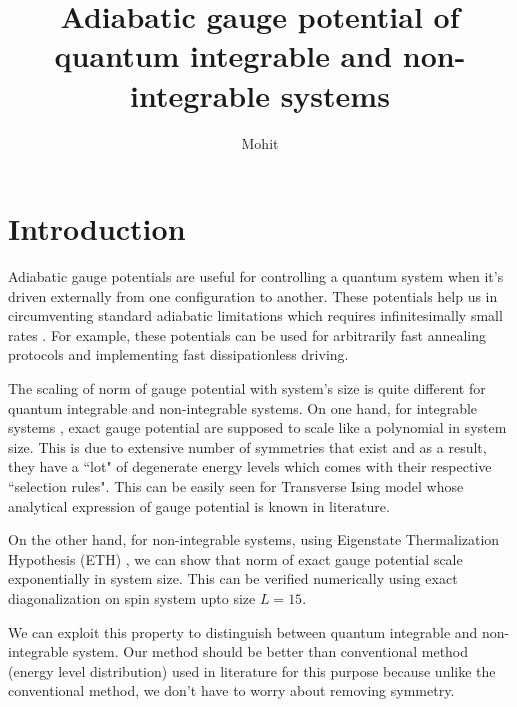 \documentclass[11pt,a4paper]{article}
\author{Mohit}
\title{Adiabatic gauge potential of quantum integrable and non-integrable systems  }
\begin{document}
\maketitle

\section{Introduction}

Adiabatic gauge potentials are useful for controlling a quantum system when it's driven externally from one configuration to another. These potentials help us in  circumventing standard adiabatic limitations which requires infinitesimally small rates \cite{demirplak2003adiabatic,demirplak2005assisted, berry2009transitionless}. For example, these potentials can be used for arbitrarily fast annealing protocols and implementing fast dissipationless driving. 



The scaling of norm of gauge potential with system's size is quite different for  quantum integrable and non-integrable systems. On one hand, for integrable systems , exact gauge potential are supposed to scale like a polynomial in system size. This is due to extensive number of symmetries that exist and as a result, they have a ``lot" of degenerate energy levels which comes with their respective ``selection rules".  This can be easily seen  for Transverse Ising model whose analytical expression of gauge potential is known in literature.

On the other hand, for non-integrable systems, using  Eigenstate Thermalization Hypothesis (ETH)\cite{d2016quantum} , we can show that norm of exact gauge potential scale exponentially in system size. This can be verified numerically using exact diagonalization on spin system upto size $L=15$. 


We can exploit this property to distinguish  between quantum integrable and non-integrable system. Our method should be better than conventional method (energy level distribution) used in literature for this purpose because unlike the conventional method, we don't have to worry about removing symmetry.



 
\end{document}
